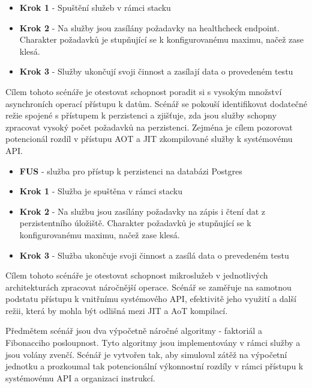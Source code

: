 
\begin{itemize}
    \item \textbf{Krok 1} - Spuštění služeb v rámci stacku
    \item \textbf{Krok 2} - Na služby jsou zasílány požadavky na healthcheck endpoint. Charakter požadavků je stupňující se k konfigurovanému maximu, načež zase klesá.
    \item \textbf{Krok 3} - Služby ukončují svoji činnost a zasílají data o provedeném testu
\end{itemize}


Cílem tohoto scénáře je otestovat schopnost poradit si s vysokým množství asynchroních operací přístupu k datům. Scénář se pokouší identifikovat dodatečné režie spojené s přístupem k perzistenci a zjišťuje, zda jsou služby schopny zpracovat vysoký počet požadavků na perzistenci. Zejména je cílem pozorovat potencionál rozdíl v přístupu AOT a JIT zkompilované služby k systémovému API.


\begin{itemize}
    \item \textbf{FUS} - služba pro přístup k perzistenci na databázi Postgres
\end{itemize}


\begin{itemize}
    \item \textbf{Krok 1} - Služba je spuštěna v rámci stacku
    \item \textbf{Krok 2} - Na službu jsou zasílány požadavky na zápis i čtení dat z perzistentního úložiště. Charakter požadavků je stupňující se k konfigurovanému maximu, načež zase klesá.
    \item \textbf{Krok 3} - Služba ukončuje svoji činnost a zasílá data o prevedeném testu
\end{itemize}


Cílem tohoto scénáře je otestovat schopnost mikroslužeb v jednotlivých architekturách zpracovat náročnější operace. Scénář se zaměřuje na samotnou podstatu přístupu k vnitřnímu systémového API, efektivitě jeho využití a další režii, která by mohla být odlišná mezi JIT a AoT kompilací.

Předmětem scénář jsou dva výpočetně náročné algoritmy - faktoriál a Fibonacciho posloupnost. Tyto algoritmy jsou implementovány v rámci služby a jsou volány zvenčí. Scénář je vytvořen tak, aby simuloval zátěž na výpočetní jednotku a prozkoumal tak potencionální výkonnostní rozdíly v rámci přístupu k systémovému API a organizaci instrukcí.


